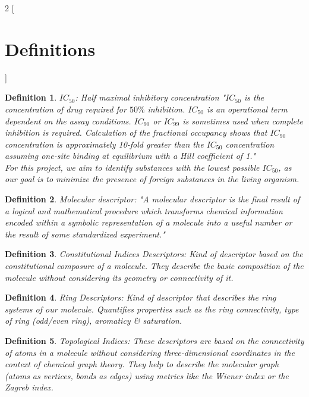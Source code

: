 \documentclass[12pt,letterpaper]{article}
\newtheorem{definition}{Definition}
\begin{document}
\begin{multicols}{2}
[
\section{Definitions}
]
\begin{definition}\label{definitionIC50}
$IC_{50}$: Half maximal inhibitory concentration "$IC_{50}$ is the concentration of drug required for $50\%$ inhibition. $IC_{50}$ is an operational term dependent on the assay conditions. $IC_{90}$ or $IC_{99}$ is sometimes used when complete inhibition is required. Calculation of the fractional occupancy shows that $IC_{90}$ concentration is approximately 10-fold greater than the $IC_{50}$ concentration assuming one-site binding at equilibrium with a Hill coefficient of 1."\cite{BookIC50}\\
 For this project, we aim to identify substances with the lowest possible $IC_{50}$, as our goal is to minimize the presence of foreign substances in the living organism.
\end{definition}

\begin{definition}
Molecular descriptor: "A molecular descriptor is the final result of a logical and mathematical procedure which transforms chemical information encoded within a symbolic representation of a molecule into a useful number or the result of some standardized experiment."\cite{DescriptorsBook}
\end{definition}

\begin{definition}
Constitutional Indices Descriptors: Kind of descriptor based on the constitutional composure of a molecule. They describe the basic composition of the molecule without considering its geometry or connectivity of it.
\end{definition}

\begin{definition}
Ring Descriptors: Kind of descriptor that describes the ring systems of our molecule. Quantifies properties such as the ring connectivity, type of ring (odd/even ring), aromaticy \& saturation.
\end{definition}

\begin{definition}
Topological Indices: These descriptors are based on the connectivity of atoms in a molecule without considering three-dimensional coordinates in the context of chemical graph theory. They help to describe the molecular graph (atoms as vertices, bonds as edges) using metrics like the Wiener index or the Zagreb index.
\end{definition}


\end{multicols}
\end{document}
